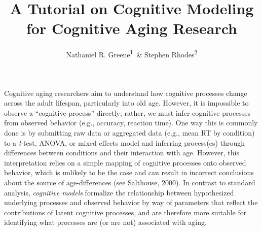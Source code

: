 \documentclass[
  english,
  ,man,floatsintext]{apa6}
\author{Nathaniel R. Greene\textsuperscript{1}\ \& Stephen Rhodes\textsuperscript{2}}
\affiliation{
\vspace{0.5cm}
\textsuperscript{1} University of Missouri\\\textsuperscript{2} Rotman Research Institute}
\title{A Tutorial on Cognitive Modeling for Cognitive Aging Research}
\date{}
\begin{document}
\maketitle

Cognitive aging researchers aim to understand how cognitive processes change across the adult lifespan, particularly into old age. However, it is impossible to observe a \enquote{cognitive process} directly; rather, we must infer cognitive processes from observed behavior (e.g., accuracy, reaction time). One way this is commonly done is by submitting raw data or aggregated data (e.g., mean RT by condition) to a \emph{t}-test, ANOVA, or mixed effects model and inferring process(es) through differences between conditions and their interaction with age. However, this interpretation relies on a simple mapping of cognitive processes onto observed behavior, which is unlikely to be the case and can result in incorrect conclusions about the source of age-differences (see Salthouse, 2000). In contrast to standard analysis, \emph{cognitive models} formalize the relationship between hypothesized underlying processes and observed behavior by way of parameters that reflect the contributions of latent cognitive processes, and are therefore more suitable for identifying what processes are (or are not) associated with aging.
\end{document}
